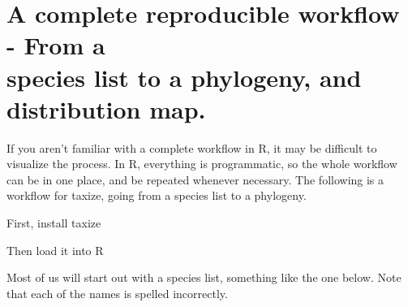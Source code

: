 
\section[A complete reproducible workflow]{\texorpdfstring{A complete reproducible workflow - From a\\species list to a phylogeny, and\\distribution map.}{A complete reproducible workflow - From a species list to a phylogeny, and distribution map.}} 
\label{ap:taxize:one} 

If you aren't familiar with a complete workflow in R, it may be difficult to visualize the process. In R, everything is programmatic, so the whole workflow can be in one place, and be repeated whenever necessary. The following is a workflow for taxize, going from a species list to a phylogeny. 

First, install taxize

\begin{knitrout}
\color{fgcolor}\small\begin{kframe}
\begin{alltt}
\hlstd{(}\hlstd{)}
\end{alltt}
\end{kframe}
\end{knitrout}


Then load it into R

\begin{knitrout}
\color{fgcolor}\small\begin{kframe}
\begin{alltt}
\end{alltt}
\end{kframe}
\end{knitrout}


Most of us will start out with a species list, something like the one below. Note that each of the names is spelled incorrectly.

\begin{knitrout}
\color{fgcolor}\small\begin{kframe}
\begin{alltt}
 \hlkwb{<-} \hlstd{(}\hlstd{,} \hlstd{,} 
                \hlstd{,} \hlstd{,}
                \hlstd{,} \hlstd{,} \hlstd{)}
\end{alltt}
\end{kframe}
\end{knitrout}


